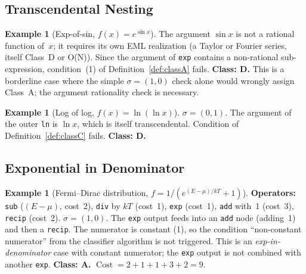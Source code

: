 \documentclass[12pt,a4paper]{article}
\theoremstyle{definition}
\newtheorem{example}[theorem]{Example}
\newcommand{\Cost}{\operatorname{Cost}}
\begin{document}
\subsection{Transcendental Nesting}

\begin{example}[Exp-of-sin, $f(x) = e^{\sin x}$]
\label{ex:expsin}
The argument $\sin x$ is not a rational function of~$x$; it requires
its own EML realization (a Taylor or Fourier series, itself Class~D or
O(N)).
Since the argument of \texttt{exp} contains a non-rational
sub-expression, condition~(1) of Definition~\ref{def:classA} fails.
\textbf{Class: D.}
This is a borderline case where the simple
$\sigma = (1,0)$ check alone would wrongly assign Class~A; the argument
rationality check is necessary.
\end{example}

\begin{example}[Log of log, $f(x) = \ln(\ln x)$]
\label{ex:lnln}
$\sigma = (0,1)$.
The argument of the outer \texttt{ln} is $\ln x$, which is itself
transcendental.
Condition of Definition~\ref{def:classC} fails.
\textbf{Class: D.}
\end{example}

\subsection{Exponential in Denominator}

\begin{example}[Fermi--Dirac distribution, $f = 1/(e^{(E-\mu)/kT} + 1)$]
\label{ex:fermi}
\textbf{Operators:} \texttt{sub} ($(E - \mu)$, cost~2), \texttt{div}
by $kT$ (cost~1), \texttt{exp} (cost~1), \texttt{add} with~1 (cost~3),
\texttt{recip} (cost~2).
$\sigma = (1,0)$.
The \texttt{exp} output feeds into an \texttt{add} node (adding~1) and
then a \texttt{recip}.
The numerator is constant (1), so the condition ``non-constant
numerator'' from the classifier algorithm is not triggered.
This is an \emph{exp-in-denominator} case with constant numerator;
the \texttt{exp} output is not combined with another \texttt{exp}.
\textbf{Class: A.}
$\Cost = 2 + 1 + 1 + 3 + 2 = 9$.
\end{example}
\end{document}
